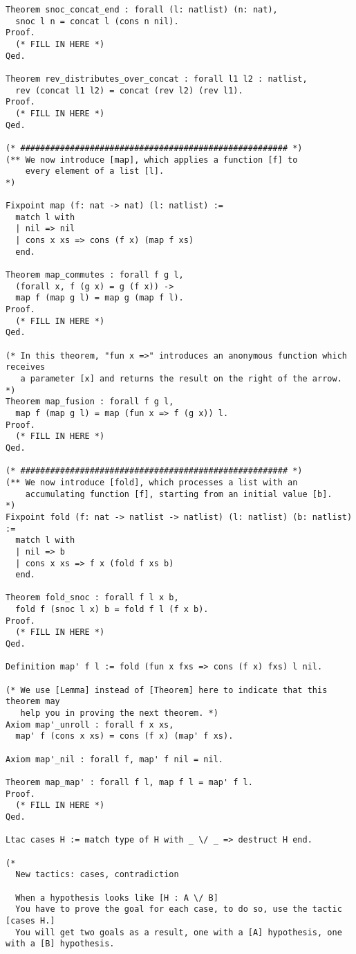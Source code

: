 \begin{verbatim}
Theorem snoc_concat_end : forall (l: natlist) (n: nat),
  snoc l n = concat l (cons n nil).
Proof.
  (* FILL IN HERE *)
Qed.

Theorem rev_distributes_over_concat : forall l1 l2 : natlist,
  rev (concat l1 l2) = concat (rev l2) (rev l1).
Proof.
  (* FILL IN HERE *)
Qed.

(* ###################################################### *)
(** We now introduce [map], which applies a function [f] to
    every element of a list [l].
*)

Fixpoint map (f: nat -> nat) (l: natlist) :=
  match l with
  | nil => nil
  | cons x xs => cons (f x) (map f xs)
  end.

Theorem map_commutes : forall f g l,
  (forall x, f (g x) = g (f x)) ->
  map f (map g l) = map g (map f l).
Proof.
  (* FILL IN HERE *)
Qed.

(* In this theorem, "fun x =>" introduces an anonymous function which receives
   a parameter [x] and returns the result on the right of the arrow. *)
Theorem map_fusion : forall f g l,
  map f (map g l) = map (fun x => f (g x)) l.
Proof.
  (* FILL IN HERE *)
Qed.

(* ###################################################### *)
(** We now introduce [fold], which processes a list with an
    accumulating function [f], starting from an initial value [b].
*)
Fixpoint fold (f: nat -> natlist -> natlist) (l: natlist) (b: natlist) :=
  match l with
  | nil => b
  | cons x xs => f x (fold f xs b)
  end.

Theorem fold_snoc : forall f l x b,
  fold f (snoc l x) b = fold f l (f x b).
Proof.
  (* FILL IN HERE *)
Qed.

Definition map' f l := fold (fun x fxs => cons (f x) fxs) l nil.

(* We use [Lemma] instead of [Theorem] here to indicate that this theorem may
   help you in proving the next theorem. *)
Axiom map'_unroll : forall f x xs,
  map' f (cons x xs) = cons (f x) (map' f xs).

Axiom map'_nil : forall f, map' f nil = nil.

Theorem map_map' : forall f l, map f l = map' f l.
Proof.
  (* FILL IN HERE *)
Qed.

Ltac cases H := match type of H with _ \/ _ => destruct H end.

(*
  New tactics: cases, contradiction

  When a hypothesis looks like [H : A \/ B]
  You have to prove the goal for each case, to do so, use the tactic [cases H.]
  You will get two goals as a result, one with a [A] hypothesis, one with a [B] hypothesis.


\end{verbatim}
